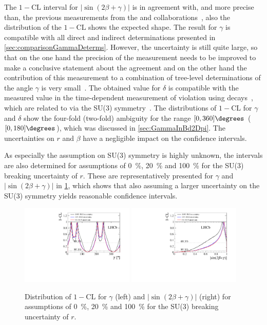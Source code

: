The $1-\text{CL}$ interval for $\left|\sin\!\left(2\beta+\gamma\right)\right|$ is in agreement with, and more precise than, the previous measurements from the \belle and \babar collaborations~\cite{Ronga:2006hv,Aubert:2006tw}, also the distribution of the $1-\text{CL}$ shows the expected shape.
The result for $\gamma$ is compatible with all direct and indirect determinations presented in \cref{sec:comparisonGammaDeterms}.
However, the uncertainty is still quite large, so that on the one hand the precision of the measurement needs to be improved to make a conclusive statement about the agreement and on the other hand the contribution of this measurement to a combination of tree-level determinations of the angle $\gamma$ is very small~\cite{GammCombo}.
The obtained value for $\delta$ is compatible with the measured value in the time-dependent measurement of \CP violation using \BsToDsK decays~\cite{Aaij:2017lff}, which are related to \BdToDpi via the SU(3) symmetry~\cite{Fleischer:2003yb}.
The distributions of $1-\text{CL}$ for $\gamma$ and $\delta$ show the four-fold (two-fold) ambiguity for the range $[0, 360]\degrees$ ($[0, 180]\degrees$), which was discussed in \cref{sec:GammaInBd2Dpi}.
The uncertainties on $r$ and $\beta$ have a negligible impact on the confidence intervals.

As especially the assumption on SU(3) symmetry is highly unknown, the intervals are also determined for assumptions of \SI{0}{\percent}, \SI{20}{\percent} and \SI{100}{\percent} for the SU(3) breaking uncertainty of $r$.
These are representatively presented for $\gamma$ and $\left|\sin\!\left(2\beta+\gamma\right)\right|$ in \cref{fig:SU3Scan}, which shows that also assuming a larger uncertainty on the SU(3) symmetry yields reasonable confidence intervals.
\begin{figure}[tbp]
    \centering
    \includegraphics[width=0.48\textwidth]{11Result/figs/su3_scan_bd2dpi_g.pdf}
    \includegraphics[width=0.48\textwidth]{11Result/figs/su3_scan_sin2b_plus_gamma.pdf}
    \caption{Distribution of $1-\text{CL}$ for $\gamma$ (left) and $\left|\sin\!\left(2\beta+\gamma\right)\right|$ (right) for assumptions of \SI{0}{\percent}, \SI{20}{\percent} and \SI{100}{\percent} for the SU(3) breaking uncertainty of $r$.}
    \label{fig:SU3Scan}
\end{figure}
